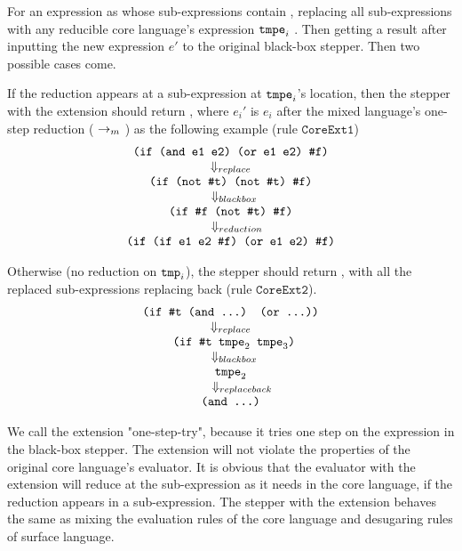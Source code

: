 For an expression as   whose sub-expressions contain , replacing all  sub-expressions with any reducible core language's expression $\mbox{\tt tmpe}_i$ . Then getting a result after inputting the new expression $e'$ to the original black-box stepper. Then two possible cases come.

If the reduction appears at a sub-expression at $\mbox{\tt tmpe}_i$'s location, then the stepper with the extension should return , where $e_i'$ is $e_i$ after the mixed language's one-step reduction ($~\rightarrow_m~$) as the following example (rule $\mathtt{CoreExt1}$)
\[
	\begin{array}{c}
		\texttt{(if (and e1 e2) (or e1 e2) \#f)}\\ 
		\Downarrow_{replace}\\ 
		\texttt{(if (not \#t) (not \#t) \#f)}\\ 
		\;\;\Downarrow_{blackbox}\\ 
		\texttt{(if \#f (not \#t) \#f)}\\ 
		\quad\Downarrow_{reduction}\\ 
		\texttt{(if (if e1 e2 \#f) (or e1 e2) \#f)}
	\end{array}
\]

Otherwise (no reduction on $\mbox{\tt tmp}_i$), the stepper should return , with all the replaced sub-expressions replacing back (rule $\mathtt{CoreExt2}$).
\[
	\begin{array}{c}
		\texttt{(if \#t (and ...) (or ...))}\\ 
		\Downarrow_{replace} \\
		\texttt{ (if \#t $\mbox{\tt tmpe}_2$ $\mbox{\tt tmpe}_3$)}\\ 
		\;\;\Downarrow_{blackbox}\\  
		\texttt{$\mbox{\tt tmpe}_2$}\\ 
		\quad\;\;\;\Downarrow_{replaceback}\\ 
		\texttt{(and ...)}
	\end{array}
\]

We call the extension "one-step-try", because it tries one step on the expression in the black-box stepper. The extension will not violate the properties of the original core language's evaluator. It is obvious that the evaluator with the extension will reduce at the sub-expression as it needs in the core language, if the reduction appears in a sub-expression. The stepper with the extension behaves the same as mixing the evaluation rules of the core language and desugaring rules of surface language.

